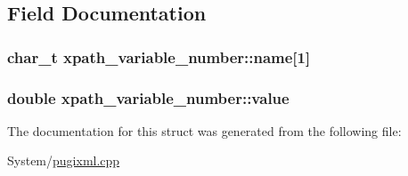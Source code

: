 \subsection{Field Documentation}
\hypertarget{structxpath__variable__number_a2bf4163dab1a8e233d45677fee987f0f}{
\subsubsection[{name}]{\setlength{\rightskip}{0pt plus 5cm}char\-\_\-t xpath\-\_\-variable\-\_\-number\-::name\mbox{[}1\mbox{]}}}\label{structxpath__variable__number_a2bf4163dab1a8e233d45677fee987f0f}
\hypertarget{structxpath__variable__number_a49949397348e7c941d88a694ec5c8e57}{
\subsubsection[{value}]{\setlength{\rightskip}{0pt plus 5cm}double xpath\-\_\-variable\-\_\-number\-::value}}\label{structxpath__variable__number_a49949397348e7c941d88a694ec5c8e57}


The documentation for this struct was generated from the following file\-:\begin{DoxyCompactItemize}
\item 
System/\hyperlink{pugixml_8cpp}{pugixml.\-cpp}\end{DoxyCompactItemize}
